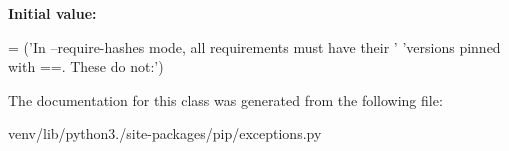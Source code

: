 {\bfseries Initial value\+:}
\begin{DoxyCode}
=  (\textcolor{stringliteral}{'In --require-hashes mode, all requirements must have their '}
            \textcolor{stringliteral}{'versions pinned with ==. These do not:'})
\end{DoxyCode}


The documentation for this class was generated from the following file\+:\begin{DoxyCompactItemize}
\item 
venv/lib/python3./site-\/packages/pip/exceptions.\+py\end{DoxyCompactItemize}
